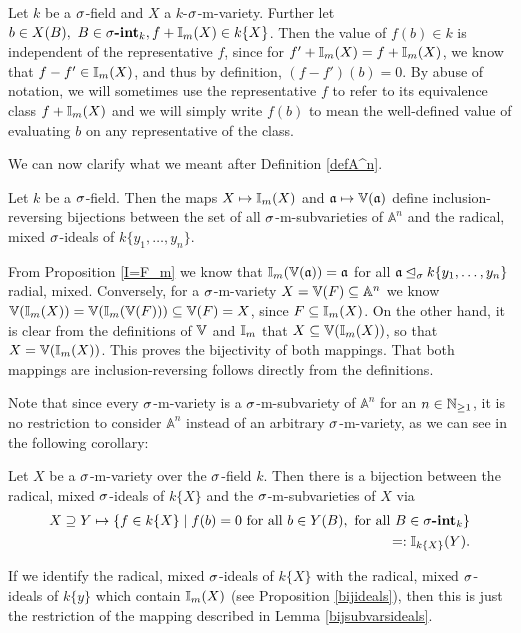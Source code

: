 \begin{rem}
Let $k$ be a $\sigma$-field and $X$ a $k$-$\sigma$-m-variety. Further let $b \in X(B), ~ B \in \sigma\text{{\normalfont\textbf{-int}}}_k, f + \mathbb{I}_m(X) \in k\{X\}$. Then the value of $f(b) \in k$ is independent of the representative $f$,
since for $f' + \mathbb{I}_m(X) = f + \mathbb{I}_m(X)$, we know that $f - f' \in \mathbb{I}_m(X)$, and thus by definition, $(f - f')(b) = 0$. By abuse of notation,
we will sometimes use the representative $f$ to refer to its equivalence class $f + \mathbb{I}_m(X)$ and we will simply write $f(b)$ to mean the well-defined value of evaluating $b$ on any representative of the class.
\end{rem}

We can now clarify what we meant after Definition \ref{defA^n}.

 \begin{lem}\label{bijsubvarsideals}
Let $k$ be a $\sigma$-field. Then the maps $X \mapsto \mathbb{I}_m(X)$ and $\mathfrak{a} \mapsto \mathbb{V}(\mathfrak{a})$ define inclusion-reversing bijections between the set of all $\sigma$-m-subvarieties of $\mathbb{A}^n$ and the radical, mixed $\sigma$-ideals of $k\{y_1,\ldots,y_n\}$.
\begin{bew}
From Proposition \ref{I=F_m} we know that $\mathbb{I}_m(\mathbb{V}(\mathfrak{a})) = \mathfrak{a}$ for all $\mathfrak{a} \unlhd_{\sigma} k\{y_1,\ldots,y_n\}$ radial, mixed. Conversely, for a $\sigma$-m-variety $X = \mathbb{V}(F) \subseteq \mathbb{A}^n$ we know  $\mathbb{V}(\mathbb{I}_m(X)) = \mathbb{V}(\mathbb{I}_m(\mathbb{V}(F))) \subseteq \mathbb{V}(F) = X$,
 since $F \subseteq \mathbb{I}_m(X)$. On the other hand, it is clear from the definitions of $\mathbb{V}$ and $ \mathbb{I}_m$ that $X \subseteq \mathbb{V}(\mathbb{I}_m(X))$, so that $X = \mathbb{V}(\mathbb{I}_m(X))$. This proves the bijectivity of both mappings. That both mappings are inclusion-reversing follows directly from the definitions.
\end{bew}
\end{lem}

Note that since every $\sigma$-m-variety is a $\sigma$-m-subvariety of $\mathbb{A}^n$ for an $n \in \mathbb{N}_{\geq1}$, it is no restriction to consider $\mathbb{A}^n$ instead of an arbitrary $\sigma$-m-variety, as we can see in the following corollary:
\begin{cor}
  Let $X$ be a $\sigma$-m-variety over the $\sigma$-field $k$. Then there is a bijection between the radical, mixed $\sigma$-ideals of $k\{X\}$ and the $\sigma$-m-subvarieties of $X$ via
 \begin{align*} X \supseteq Y \mapsto \{f \in k\{X\} \mid f(b) = 0 \text{ for all } b \in Y(B), \text{ for all } B \in \sigma\text{{\normalfont\textbf{-int}}}_k \} \\ =: \mathbb{I}_{k\{X\}}(Y). \end{align*}
\begin{bew}
If we identify the radical, mixed $\sigma$-ideals of $k\{X\}$ with the radical, mixed $\sigma$-ideals of $k\{y\}$ which contain $\mathbb{I}_m(X)$ (see Proposition \ref{bijideals}), then this is just the restriction of the mapping described in Lemma \ref{bijsubvarsideals}.
\end{bew}
\end{cor}

